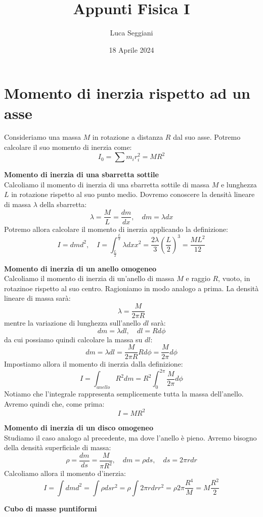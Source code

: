 \documentclass[a4paper,12pt]{article}
\title{Appunti Fisica I}
\author{Luca Seggiani}
\date{18 Aprile 2024}
\begin{document}
\maketitle
\section{Momento di inerzia rispetto ad un asse}
Consideriamo una massa $M$ in rotazione a distanza $R$ dal suo asse. Potremo calcolare il suo momento di inerzia come:
$$ I_0 = \sum m_ir_i^2 = MR^2$$
\par\smallskip
\textbf{Momento di inerzia di una sbarretta sottile}\\
Calcoliamo il momento di inerzia di una sbarretta sottile di massa $M$ e lunghezza $L$ in rotazione rispetto al suo punto medio.
Dovremo conoscere la densità lineare di massa $\lambda$ della sbarretta:
$$ \lambda = \frac{M}{L} = \frac{dm}{dx}, \quad dm = \lambda dx $$
Potremo allora calcolare il momento di inerzia applicando la definizione:
$$ I= dm d^2, \quad I = \int_{\frac{L}{2}}^{\frac{L}{2}} \lambda dx x^2 = \frac{2\lambda}{3} \left(\frac{L}{2}\right)^3 = \frac{ML^2}{12} $$
\par\smallskip
\textbf{Momento di inerzia di un anello omogeneo} \\
Calcoliamo il momento di inerzia di un'anello di massa $M$ e raggio $R$, vuoto, in rotazinoe rispetto al suo centro. Ragioniamo in
modo analogo a prima. La densità lineare di massa sarà:
$$ \lambda = \frac{M}{2\pi R} $$
mentre la variazione di lunghezza sull'anello $dl$ sarà:
$$ dm = \lambda dl, \quad dl = Rd\phi $$
da cui possiamo quindi calcolare la massa su $dl$:
$$ dm = \lambda dl = \frac{M}{2\pi R}Rd\phi = \frac{M}{2\pi}d\phi$$
Impostiamo allora il momento di inerzia dalla definizione:
$$ I = \int_{anello} R^2 dm = R^2\int_0^{2\pi} \frac{M}{2\pi}d\phi $$
Notiamo che l'integrale rappresenta semplicemente tutta la massa dell'anello. Avremo quindi che, come prima:
$$ I = MR^2 $$
\par\smallskip
\textbf{Momento di inerzia di un disco omogeneo} \\
Studiamo il caso analogo al precedente, ma dove l'anello è pieno. Avremo bisogno della densità superficiale
di massa:
$$ \rho = \frac{dm}{ds} = \frac{M}{\pi R^2}, \quad dm = \rho ds, \quad ds = 2\pi r dr $$
Calcoliamo allora il momento d'inerzia:
$$ I = \int dm d^2 = \int \rho ds r^2 = \rho \int 2\pi rdrr^2 = \rho 2\pi \frac{R^4}{M} = M \frac{R^2}{2} $$
\par\smallskip
\textbf{Cubo di masse puntiformi} \\
\end{document}
